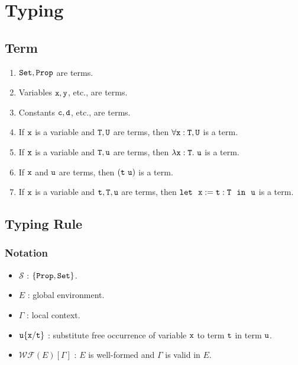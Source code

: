 \section{Typing}

\subsection{Term}

\begin{enumerate}
    \item $\tt Set,Prop$ are terms.
    \item Variables $\tt x,y$, etc., are terms.
    \item Constants $\tt c,d$, etc., are terms.
    \item If $\tt x$ is a variable and $\tt T,U$ are terms, then $\forall\tt x:T,U$ is a term.
    \item If $\tt x$ is a variable and $\tt T,u$ are terms, then $\lambda\tt x:T.\ u$ is a term.
    \item If $\tt x$ and $\tt u$ are terms, then $\tt (t\ u)$ is a term.
    \item If $\tt x$ is a variable and $\tt t,T,u$ are terms, then $\tt let\ \ x:=t:T\ \ in\ \ u$ is a term.
\end{enumerate}

\subsection{Typing Rule}

\subsubsection{Notation}
\begin{itemize}
\item $\mathcal S$ : $\{\tt Prop,Set\}$.
\item $E$ : global environment.
\item $\Gamma$ : local context.
\item $\tt u\{x/t\}$ : substitute free occurrence of variable $\tt x$ to term $\tt t$ in term $\tt u$.
\item $\mathcal{WF}(E)[\Gamma]$ : $E$ is well-formed and $\Gamma$ is valid in $E$.
\end{itemize}

